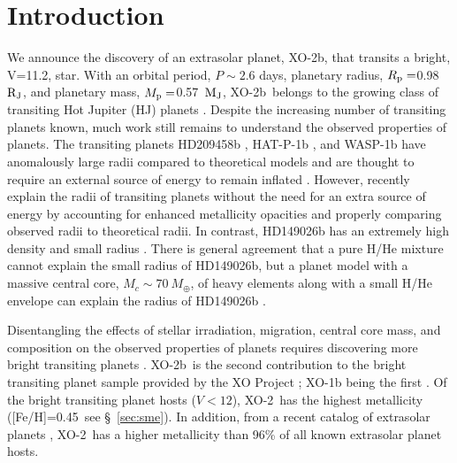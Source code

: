 \documentclass{emulateapj}
\newcommand{\Mjup}{${\rm M_J}$}
\newcommand{\xonb}{XO-2b}
\newcommand{\xon}{XO-2}
\newcommand{\Rjup}{${\rm R_J}$}
\newcommand{\vMp}{0.57}
\newcommand{\vRp}{0.98}
\newcommand{\vFeH}{0.45}
\begin{document}

\section{Introduction}

We announce the discovery of an extrasolar planet, \xonb, that
transits a bright, V=11.2, star.  With an orbital period, $P\sim 2.6$
days, planetary radius, $R_{\rm p}=$\vRp\ \Rjup, and planetary mass,
$M_{\rm p}=$\vMp\ \Mjup,
\xonb\ belongs to the growing class of transiting Hot Jupiter (HJ)
planets \citep{CHA07}.  Despite the increasing number of transiting
planets known, much work still remains to understand the observed
properties of planets.  The transiting planets HD209458b
\citep{CHA00,HEN00}, HAT-P-1b \citep{BAK07}, and WASP-1b \citep{CAM07,CHA07b} have anomalously large
radii compared to theoretical models and are thought to require an
external source of energy to remain inflated
\citep{BOD03,GUI02,WIN05}.  However, recently \citet{BUR06} explain
the radii of transiting planets without the need for an extra source
of energy by accounting for enhanced metallicity opacities and
properly comparing observed radii to theoretical radii.  In contrast,
HD149026b has an extremely high density and small radius
\citep{SAT05}.  There is general agreement that a pure H/He mixture
cannot explain the small radius of HD149026b, but a planet model
with a massive central core, $M_{c}\sim 70\ M_{\oplus}$, of heavy
elements along with a small H/He envelope can explain the
radius of HD149026b
\citep{SAT05,FORT06}.

Disentangling the effects of stellar irradiation, migration, central core mass,
and composition on the observed properties of planets requires discovering
more bright transiting planets \citep{CHA07,FORT06}.  \xonb\ is the
second contribution to the bright transiting planet sample provided by
the XO Project \citep{MCC05}; XO-1b being the first \citep{MCC06}.  Of
the bright transiting planet hosts ($V<12$), \xon\ has the highest metallicity ([Fe/H]=\vFeH\ see
\S~\ref{sec:sme}).  In addition, from a recent catalog of extrasolar planets
\citep{BUT06}, \xon\ has a higher metallicity than 96\% of all known
extrasolar planet hosts.
\end{document}
